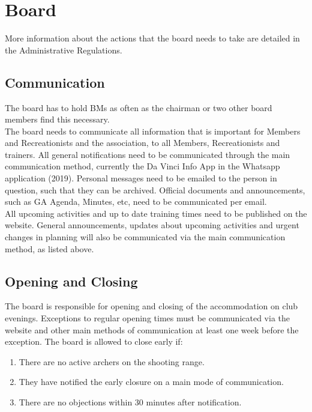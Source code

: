 \documentclass[a4paper]{article}
\newcommand{\Abr}{Administrative Regulations} %
\begin{document}
\section{Board}
More information about the actions that the board needs to take are detailed in the \Abr .
\subsection{Communication}
The board has to hold { BM}s as often as the chairman or two other board members find this necessary. \\

The board needs to communicate all information that is important for { Members} and { Recreationists} and the association, to all { Members}, { Recreationists} and trainers. All general notifications need to be communicated through the main communication method, currently the Da Vinci Info App in the Whatsapp application {\g (2019)}. Personal messages need to be emailed to the person in question, such that they can be archived. Official documents and announcements, such as { GA} Agenda, Minutes, etc, need to be communicated per email. \\
 
All upcoming activities and up to date training times need to be published on the website. 
General announcements, updates about upcoming activities and urgent changes in planning will also be communicated via the main communication method, as listed above.

\subsection{Opening and Closing}
The board is responsible for opening and closing of the { accommodation} on club evenings. Exceptions to regular opening times must be communicated via the website and other main methods of communication at least one week before the exception. The board is allowed to close early if:

\begin{enumerate}
\item There are no active { archers} on the shooting range.
\item They have notified the early closure on a main mode of communication.
\item There are no objections within 30 minutes after notification.
\end{enumerate}
\end{document}
